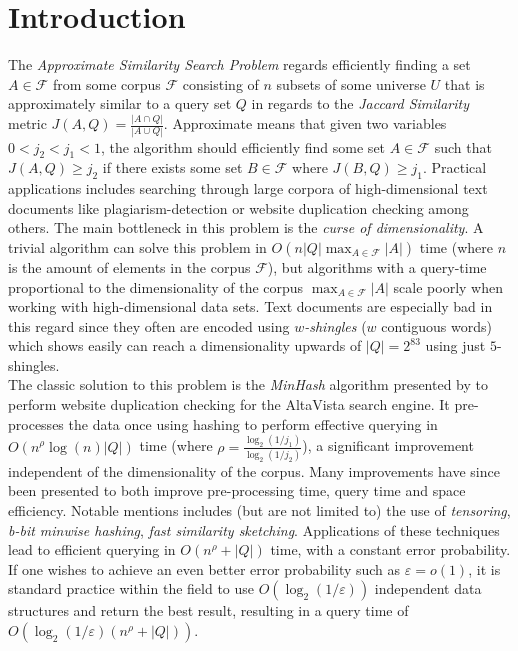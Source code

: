 \section{Introduction}
The \textit{Approximate Similarity Search Problem} regards efficiently finding a set $A\in \mathcal{F}$ from some corpus $\mathcal{F}$ consisting of $n$ subsets of some universe $U$ that is approximately similar to a query set $Q$ in regards to the \textit{Jaccard Similarity} metric $J(A,Q) = \frac{|A\cap Q|}{|A\cup Q|}$\cite{dahlgaard2017fast}\cite{fast-similarity-search}. Approximate means that given two variables $0 < j_2 < j_1 < 1$, the algorithm should efficiently find some set $A\in \mathcal{F}$ such that $J(A, Q) \geq j_2$ if there exists some set $B\in \mathcal{F}$ where $J(B,Q)\geq j_1$.
Practical applications includes searching through large corpora of high-dimensional text documents like plagiarism-detection or website duplication checking among others\cite{vassilvitskii2018}. The main bottleneck in this problem is the \textit{curse of dimensionality}. 
A trivial algorithm can solve this problem in $O(n|Q|\max_{A\in \mathcal{F}}{|A|})$ time (where $n$ is the amount of elements in the corpus $\mathcal{F}$), but algorithms with a query-time proportional to the dimensionality of the corpus $\max_{A\in \mathcal{F}}|A|$ scale poorly when working with high-dimensional data sets. 
Text documents are especially bad in this regard since they often are encoded using \textit{$w$-shingles} ($w$ contiguous words) which \citet{li2011hashing} shows easily can reach a dimensionality upwards of $|Q|=2^{83}$ using just $5$-shingles.\\
The classic solution to this problem is the \textit{MinHash} algorithm presented by \citet{broder1997minhash} to perform website duplication checking for the AltaVista search engine. 
It pre-processes the data once using hashing to perform effective querying in $O(n^\rho\log(n)|Q|)$ time (where $\rho = \frac{\log_2{(1/j_1)}}{\log_2{(1/j_2)}}$), a significant improvement independent of the dimensionality of the corpus.
Many improvements have since been presented to both improve pre-processing time, query time and space efficiency. 
Notable mentions includes (but are not limited to) the use of \textit{tensoring}\cite{andoni2006efficient}, \textit{b-bit minwise hashing}\cite{ping2011theory}, \textit{fast similarity sketching}\cite{dahlgaard2017fast}. 
Applications of these techniques lead to efficient querying in $O(n^\rho + |Q|)$ time, with a constant error probability. If one wishes to achieve an even better error probability such as $\varepsilon = o(1)$, it is standard practice within the field to use $O(\log_2(1/\varepsilon))$ independent data structures and return the best result, resulting in a query time of $O(\log_2(1/\varepsilon) (n^\rho + |Q|))$. 

